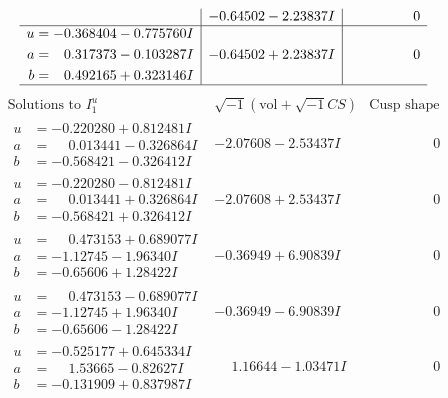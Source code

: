 \documentclass[1p]{elsarticle_modified}
\theoremstyle{definition}
\newcommand{\I}{\sqrt{-1}}
\begin{document}
$$\begin{array}{c|c|c}
 & -0.64502 - 2.23837 I & \phantom{-0.000000 } 0 \\ \hline\begin{aligned}
u &= -0.368404 - 0.775760 I \\
a &= \phantom{-}0.317373 - 0.103287 I \\
b &= \phantom{-}0.492165 + 0.323146 I\end{aligned}
 & -0.64502 + 2.23837 I & \phantom{-0.000000 } 0\\
 \hline 
 \end{array}$$\newpage$$\begin{array}{c|c|c}  
\text{Solutions to }I^u_{1}& \I (\text{vol} + \sqrt{-1}CS) & \text{Cusp shape}\\
 \hline 
\begin{aligned}
u &= -0.220280 + 0.812481 I \\
a &= \phantom{-}0.013441 - 0.326864 I \\
b &= -0.568421 - 0.326412 I\end{aligned}
 & -2.07608 - 2.53437 I & \phantom{-0.000000 } 0 \\ \hline\begin{aligned}
u &= -0.220280 - 0.812481 I \\
a &= \phantom{-}0.013441 + 0.326864 I \\
b &= -0.568421 + 0.326412 I\end{aligned}
 & -2.07608 + 2.53437 I & \phantom{-0.000000 } 0 \\ \hline\begin{aligned}
u &= \phantom{-}0.473153 + 0.689077 I \\
a &= -1.12745 - 1.96340 I \\
b &= -0.65606 + 1.28422 I\end{aligned}
 & -0.36949 + 6.90839 I & \phantom{-0.000000 } 0 \\ \hline\begin{aligned}
u &= \phantom{-}0.473153 - 0.689077 I \\
a &= -1.12745 + 1.96340 I \\
b &= -0.65606 - 1.28422 I\end{aligned}
 & -0.36949 - 6.90839 I & \phantom{-0.000000 } 0 \\ \hline\begin{aligned}
u &= -0.525177 + 0.645334 I \\
a &= \phantom{-}1.53665 - 0.82627 I \\
b &= -0.131909 + 0.837987 I\end{aligned}
 & \phantom{-}1.16644 - 1.03471 I & \phantom{-0.000000 } 0 \\ \hline\begin{aligned}

\end{aligned}
\end{array}$$
\end{document}
